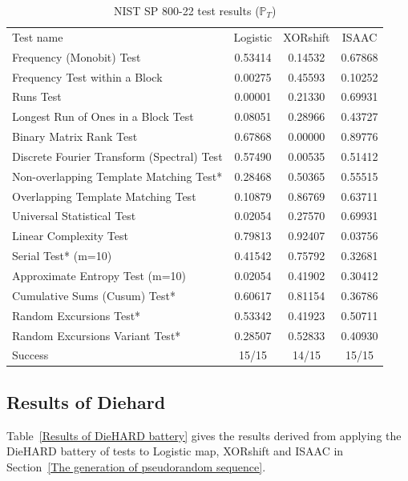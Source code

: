 \begin{table}[!t]
\renewcommand{\arraystretch}{1.3}
\caption{NIST SP 800-22 test results ($\mathbb{P}_T$)}
\label{The passing1}
\centering
  \begin{tabular}{lccc}
    \toprule
Test name &Logistic& XORshift& ISAAC\\ 

Frequency (Monobit) Test 					&0.53414		&0.14532		&0.67868 \\ 
Frequency Test within a Block  					&0.00275		&0.45593		&0.10252 \\ 
Runs Test 							&0.00001		&0.21330		&0.69931  \\ 
Longest Run of Ones in a Block Test 				&0.08051		&0.28966		&0.43727   \\
Binary Matrix Rank Test 					&0.67868		&0.00000		&0.89776  \\ 
Discrete Fourier Transform (Spectral) Test			&0.57490		&0.00535		&0.51412   \\ 
Non-overlapping Template Matching Test* 			&0.28468		&0.50365		&0.55515  \\ 
Overlapping Template Matching Test   				&0.10879		&0.86769		&0.63711  \\ 
Universal Statistical Test   					&0.02054		&0.27570		&0.69931   \\ 
Linear Complexity Test  					&0.79813		&0.92407		&0.03756    \\ 
Serial Test* (m=10) 						&0.41542		&0.75792		&0.32681   \\ 
Approximate Entropy Test (m=10) 				&0.02054		&0.41902		&0.30412  \\ 
Cumulative Sums (Cusum) Test* 					&0.60617		&0.81154		&0.36786\\ 
Random Excursions Test* 					&0.53342		&0.41923		&0.50711   \\ 
Random Excursions Variant Test* 				&0.28507		&0.52833		&0.40930    \\ \hline
Success 							&15/15		&14/15			&15/15 \\ 
\bottomrule
  \end{tabular}
\end{table}

\subsection{Results of Diehard}
\label{Subsec:DieHARD}

Table~\ref{Results of DieHARD battery} gives the results derived from applying the DieHARD battery of tests to Logistic map, XORshift and ISAAC in Section~\ref{The generation of pseudorandom sequence}.

